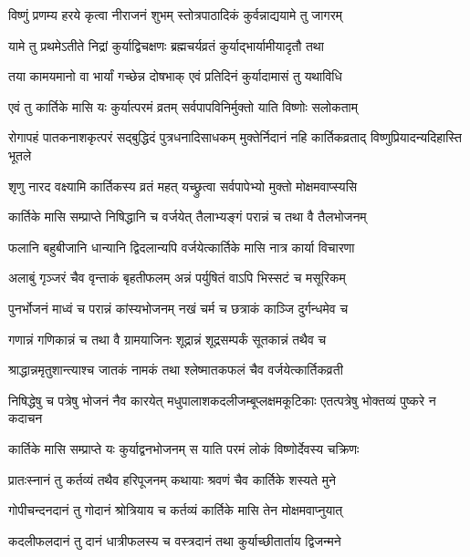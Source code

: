 \twolineshloka
{विष्णुं प्रणम्य हरये कृत्वा नीराजनं शुभम्}
{स्तोत्रपाठादिकं कुर्वन्नाद्ययामे तु जागरम्} %

\twolineshloka
{यामे तु प्रथमेऽतीते निद्रां कुर्याद्विचक्षणः}
{ब्रह्मचर्यव्रतं कुर्याद्भार्यामीयादृतौ तथा} %

\twolineshloka
{तया कामयमानो वा भार्यां गच्छेन्न दोषभाक्}
{एवं प्रतिदिनं कुर्यादामासं तु यथाविधि} %

\twolineshloka
{एवं तु कार्तिके मासि यः कुर्यात्परमं व्रतम्}
{सर्वपापविनिर्मुक्तो याति विष्णोः सलोकताम्} %

\fourlineindentedshloka
{रोगापहं पातकनाशकृत्परं}
{सद्बुद्धिदं पुत्रधनादिसाधकम्}
{मुक्तेर्निदानं नहि कार्तिकव्रताद्}
{विष्णुप्रियादन्यदिहास्ति भूतले} %





\twolineshloka
{शृणु नारद वक्ष्यामि कार्तिकस्य व्रतं महत्}
{यच्छ्रुत्वा सर्वपापेभ्यो मुक्तो मोक्षमवाप्स्यसि} %

\twolineshloka
{कार्तिके मासि सम्प्राप्ते निषिद्धानि च वर्जयेत्}
{तैलाभ्यङ्गं परान्नं च तथा वै तैलभोजनम्} %

\twolineshloka
{फलानि बहुबीजानि धान्यानि द्विदलान्यपि}
{वर्जयेत्कार्तिके मासि नात्र कार्या विचारणा} %

\twolineshloka
{अलाबुं गृञ्जरं चैव वृन्ताकं बृहतीफलम्}
{अन्नं पर्युषितं वाऽपि भिस्सटं च मसूरिकम्} %

\twolineshloka
{पुनर्भोजनं माध्वं च परान्नं कांस्यभोजनम्}
{नखं चर्म च छत्राकं काञ्जि दुर्गन्धमेव च} %

\twolineshloka
{गणान्नं गणिकान्नं च तथा वै ग्रामयाजिनः}
{शूद्रान्नं शूद्रसम्पर्कं सूतकान्नं तथैव च} %

\twolineshloka
{श्राद्धान्नमृतुशान्त्याश्च जातकं नामकं तथा}
{श्लेष्मातकफलं चैव वर्जयेत्कार्तिकव्रती} %

\threelineshloka
{निषिद्धेषु च पत्रेषु भोजनं नैव कारयेत्}
{मधुपालाशकदलीजम्बूप्लक्षमकूटिकाः}
{एतत्पत्रेषु भोक्तव्यं पुष्करे न कदाचन} %

\twolineshloka
{कार्तिके मासि सम्प्राप्ते यः कुर्याद्वनभोजनम्}
{स याति परमं लोकं विष्णोर्देवस्य चक्रिणः} %

\twolineshloka
{प्रातःस्नानं तु कर्तव्यं तथैव हरिपूजनम्}
{कथायाः श्रवणं चैव कार्तिके शस्यते मुने} %

\twolineshloka
{गोपीचन्दनदानं तु गोदानं श्रोत्रियाय च}
{कर्तव्यं कार्तिके मासि तेन मोक्षमवाप्नुयात्} %

\twolineshloka
{कदलीफलदानं तु दानं धात्रीफलस्य च}
{वस्त्रदानं तथा कुर्याच्छीतार्ताय द्विजन्मने} %

